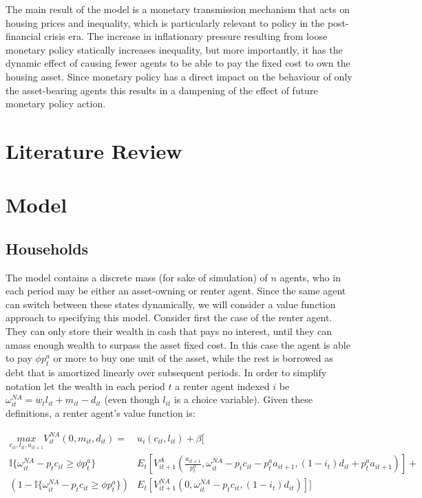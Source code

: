 \documentclass{article}
\begin{document}
The main result of the model is a monetary transmission mechanism that acts on housing prices and inequality, which is particularly relevant to policy in the post-financial crisis era. The increase in inflationary pressure resulting from loose monetary policy statically increases inequality, but more importantly, it has the dynamic effect of causing fewer agents to be able to pay the fixed cost to own the housing asset. Since monetary policy has a direct impact on the behaviour of only the asset-bearing agents this results in a dampening of the effect of future monetary policy action.

\section{Literature Review} \label{lit_review}

\section{Model} \label{model}

\subsection{Households} \label{households}

The model contains a discrete mass (for sake of simulation) of $n$ agents, who in each period may be either an asset-owning or renter agent. Since the same agent can switch between these states dynamically, we will consider a value function approach to specifying this model. Consider first the case of the renter agent. They can only store their wealth in cash that pays no interest, until they can amass enough wealth to surpass the asset fixed cost. In this case the agent is able to pay $\phi p^a_t$ or more to buy one unit of the asset, while the rest is borrowed as debt that is amortized linearly over subsequent periods. In order to simplify notation let the wealth in each period $t$ a renter agent indexed $i$ be $\omega^{NA}_{it} = w_t l_{it} + m_{it} - d_{it}$ (even though $l_{it}$ is a choice variable). Given these definitions, a renter agent's value function is:

\begin{align}
  \underset{c_{it}, l_{it}, a_{it+1}}{max} V^{NA}_{it}(0, m_{it}, d_{it}) = &u_{i}(c_{it}, l_{it}) + \beta [ \nonumber \\ 
  \mathbb{I}\{\omega^{NA}_{it} - p_t c_{it} \geq \phi p_t^a \} &E_t[V^A_{it+1}(\frac{a_{it+1}}{p^a_t}, \omega^{NA}_{it} - p_t c_{it} - p^a_t a_{it+1}, (1 - i_t) d_{it} + p^a_t a_{it+1})] + \nonumber \\ 
  \left(1 - \mathbb{I}\{\omega^{NA}_{it} - p_t c_{it} \geq \phi p_t^a \} \right) &E_t[V^{NA}_{it+1}(0, \omega^{NA}_{it} - p_t c_{it}, (1 - i_t) d_{it})]]\label{vna}
\end{align}
\end{document}
